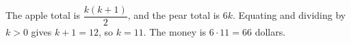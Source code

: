 The apple total is $\dfrac{k(k+1)}{2}$, and the pear total is $ 6k $. Equating and dividing by $ k>0 $ gives $ k+1=12 $, so $ k=11 $. The money is $ 6\cdot11=\boxed{66}$ dollars.
